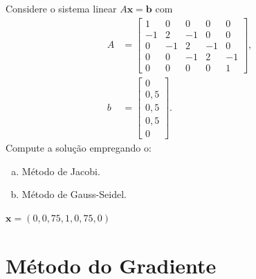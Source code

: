 \begin{exer}
  Considere o sistema linear $A\pmb{x} = \pmb{b}$ com
  \begin{align}
    A &=
        \begin{bmatrix}
          1& 0& 0& 0& 0\\
          -1& 2& -1& 0& 0\\
          0& -1& 2& -1& 0\\
          0& 0& -1& 2& -1\\
          0& 0& 0& 0& 1
        \end{bmatrix},\\
    b &=
        \begin{bmatrix}
          0\\
          0,5\\
          0,5\\
          0,5\\
          0
        \end{bmatrix}.
  \end{align}
  Compute a solução empregando o:
  \begin{enumerate}[a)]
  \item Método de Jacobi.
  \item Método de Gauss-Seidel.
  \end{enumerate}
\end{exer}
\begin{resp}
  $\pmb{x} = (0, 0,75, 1, 0,75, 0)$
\end{resp}


\section{Método do Gradiente}\label{cap_sislin_sec_metg}

